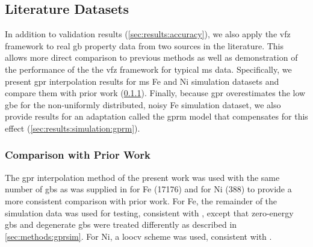 \documentclass[final,twocolumn,12pt]{elsarticle}
\begin{document}
%
%
%
%
\subsection{Literature Datasets}
\label{sec:results:simulation}

In addition to validation results (\cref{sec:results:accuracy}), we also apply the \gls{vfz} framework to real \gls{gb} property data from two sources in the literature. This allows more direct comparison to previous methods as well as demonstration of the performance of the the \gls{vfz} framework for typical \gls{ms} data. Specifically, we present \gls{gpr} interpolation results for \gls{ms} Fe and Ni simulation datasets and compare them with prior work (\cref{sec:results:simulation:compare}). Finally, because \gls{gpr} overestimates the low \gls{gbe} for the non-uniformly distributed, noisy Fe simulation dataset, we also provide results for an adaptation called the \gls{gprm} model that compensates for this effect (\cref{sec:results:simulation:gprm}).

\subsubsection{Comparison with Prior Work}
\label{sec:results:simulation:compare}

The \gls{gpr} interpolation method of the present work was used with the same number of \inpt{} \glspl{gb} as was supplied in \citet{restrepoUsingArtificialNeural2014} for Fe (\num{17176}) and \citet{chesserLearningGrainBoundary2020} for Ni (\num{388}) to provide a more consistent comparison with prior work. For Fe, the remainder of the simulation data was used for testing, consistent with \citet{restrepoUsingArtificialNeural2014}, except that zero-energy \glspl{gb} and degenerate \glspl{gb} were treated differently as described in \cref{sec:methods:gprsim}. For Ni, a \gls{loocv} scheme was used, consistent with \citet{chesserLearningGrainBoundary2020}. 
\end{document}
